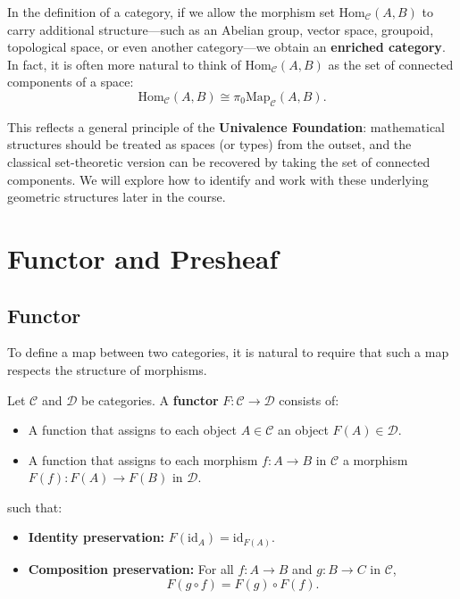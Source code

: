 \begin{remark}
In the definition of a category, if we allow the morphism set $\mathrm{Hom}_{\mathcal{C}}(A, B)$ to carry additional structure—such as an Abelian group, vector space, groupoid, topological space, or even another category—we obtain an \textbf{enriched category}. In fact, it is often more natural to think of $\mathrm{Hom}_{\mathcal{C}}(A, B)$ as the set of connected components of a space:
\[
\mathrm{Hom}_{\mathcal{C}}(A, B) \cong \pi_0 \mathrm{Map}_{\mathcal{C}}(A, B).
\]

This reflects a general principle of the \textbf{Univalence Foundation}: mathematical structures should be treated as spaces (or types) from the outset, and the classical set-theoretic version can be recovered by taking the set of connected components. We will explore how to identify and work with these underlying geometric structures later in the course.
\end{remark} 

\section{Functor and Presheaf}
\subsection{Functor}

To define a map between two categories, it is natural to require that such a map respects the structure of morphisms.

\begin{definition}[Functor]
Let $\mathcal{C}$ and $\mathcal{D}$ be categories. A \textbf{functor} $F: \mathcal{C} \to \mathcal{D}$ consists of:
\begin{itemize}
    \item A function that assigns to each object $A \in \mathcal{C}$ an object $F(A) \in \mathcal{D}$.
    \item A function that assigns to each morphism $f: A \to B$ in $\mathcal{C}$ a morphism $F(f): F(A) \to F(B)$ in $\mathcal{D}$.
\end{itemize}
such that:
\begin{itemize}
    \item \textbf{Identity preservation:} $F(\mathrm{id}_A) = \mathrm{id}_{F(A)}$.
    \item \textbf{Composition preservation:} For all $f: A \to B$ and $g: B \to C$ in $\mathcal{C}$,
    \[
    F(g \circ f) = F(g) \circ F(f).
    \]
\end{itemize}
\end{definition}

